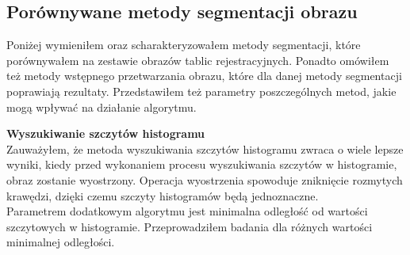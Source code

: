 \subsection{Porównywane metody segmentacji obrazu}
Poniżej wymieniłem oraz scharakteryzowałem metody segmentacji, które porównywałem na zestawie obrazów tablic rejestracyjnych. Ponadto omówiłem też metody wstępnego przetwarzania obrazu, które dla danej metody segmentacji poprawiają rezultaty. Przedstawiłem też parametry poszczególnych metod, jakie mogą wpływać na działanie algorytmu.

\textbf{Wyszukiwanie szczytów histogramu}\\
Zauważyłem, że metoda wyszukiwania szczytów histogramu zwraca o wiele lepsze wyniki, kiedy przed wykonaniem procesu wyszukiwania szczytów w histogramie, obraz zostanie wyostrzony. Operacja wyostrzenia spowoduje zniknięcie rozmytych krawędzi, dzięki czemu szczyty histogramów będą jednoznaczne. \\
Parametrem dodatkowym algorytmu jest minimalna odległość od wartości szczytowych w histogramie. Przeprowadziłem badania dla różnych wartości minimalnej odległości.\\

